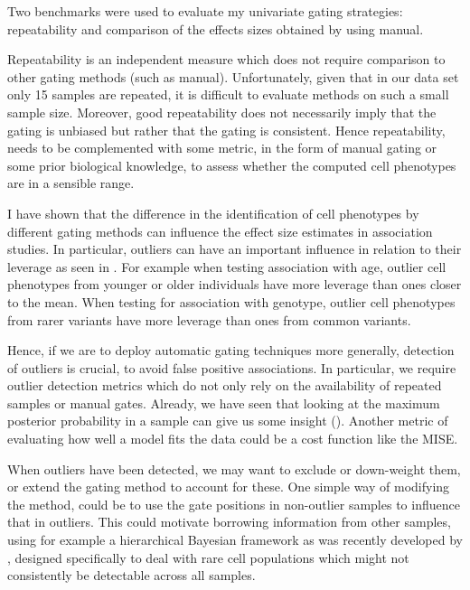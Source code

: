 Two benchmarks were used to evaluate my univariate gating strategies: repeatability and comparison of the effects sizes obtained 
by \citet{Dendrou:2009dv} using manual.

Repeatability is an independent measure which does not require comparison to other gating methods (such as manual).
Unfortunately, given that in our data set only 15 samples are repeated, it is difficult to evaluate methods on such a small sample size.
Moreover, good repeatability does not necessarily imply that the gating is unbiased but rather that the gating is consistent.
Hence repeatability, needs to be complemented with some metric, in the form of manual gating or some prior biological knowledge,
to assess whether the computed cell phenotypes are in a sensible range.

I have shown that the difference in the identification of cell phenotypes by different gating methods can influence the effect size estimates in association studies.
In particular, outliers can have an important influence in relation to their leverage as seen in .
For example when testing association with age, outlier cell phenotypes from younger or older individuals have more leverage than ones closer to the mean.
When testing for association with genotype, outlier cell phenotypes from rarer variants have more leverage than ones from common variants.

Hence, if we are to deploy automatic gating techniques more generally, detection of outliers is crucial, to avoid false positive associations.
In particular, we require outlier detection metrics which do not only rely on the availability of repeated samples or manual gates.
Already, we have seen that looking at the maximum posterior probability in a sample can give us some insight ().
Another metric of evaluating how well a model fits the data could be a cost function like the \gls{MISE}.

When outliers have been detected, we may want to exclude or down-weight them, or extend the gating method to account for these.
One simple way of modifying the method, could be to use the gate positions in non-outlier samples to influence that in outliers.
This could motivate borrowing information from other samples, using for example a hierarchical Bayesian framework as was recently developed by \citet{Cron:2013dh},
designed specifically to deal with rare cell populations which might not consistently be detectable across all samples.

